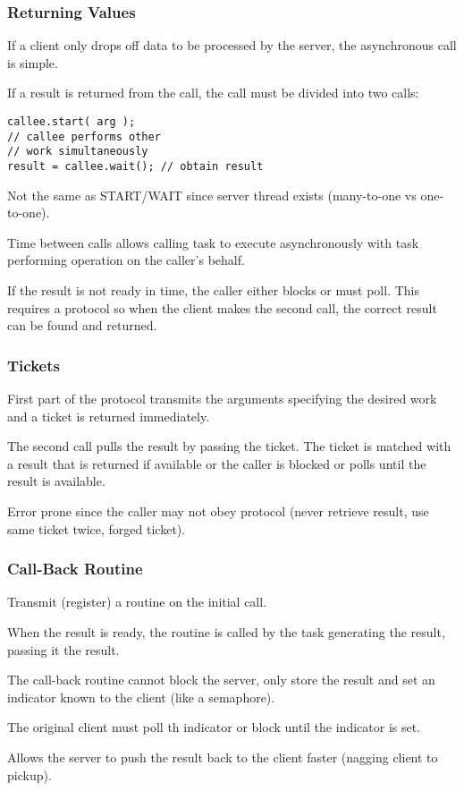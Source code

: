 \documentclass[11pt]{article}
\begin{document}
\subsubsection{Returning Values}
\label{sec:org4d56aa4}
If a client only drops off data to be processed by the server, the
asynchronous call is simple.

If a result is returned from the call, the call must be divided into
two calls:
\begin{verbatim}
callee.start( arg );
// callee performs other
// work simultaneously
result = callee.wait(); // obtain result
\end{verbatim}
Not the same as START/WAIT since server thread exists (many-to-one vs
one-to-one).

Time between calls allows calling task to execute asynchronously with
task performing operation on the caller's behalf.

If the result is not ready in time, the caller either blocks or must
poll.
This requires a protocol so when the client makes the second call, the
correct result can be found and returned.
\subsubsection{Tickets}
\label{sec:orgf89f437}
First part of the protocol transmits the arguments specifying the
desired work and a ticket is returned immediately.

The second call pulls the result by passing the ticket.
The ticket is matched with a result that is returned if available or
the caller is blocked or polls until the result is available.

Error prone since the caller may not obey protocol (never retrieve result,
use same ticket twice, forged ticket).
\subsubsection{Call-Back Routine}
\label{sec:org95ca07d}
Transmit (register) a routine on the initial call.

When the result is ready, the routine is called by the task generating the
result, passing it the result.

The call-back routine cannot block the server, only store the result and
set an indicator known to the client (like a semaphore).

The original client must poll th indicator or block until the indicator
is set.

Allows the server to push the result back to the client faster (nagging
client to pickup).
\end{document}

